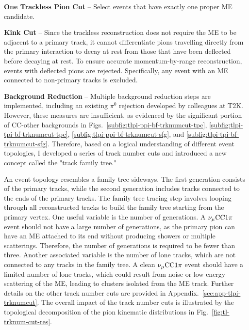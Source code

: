           \textbf{One Trackless Pion Cut} – Select events that have exactly one proper ME candidate.

          \textbf{Kink Cut} – Since the trackless reconstruction does not require the ME to be adjacent to a primary track, it cannot differentiate pions travelling directly from the primary interaction to decay at rest from those that have been deflected before decaying at rest. 
          To ensure accurate momentum-by-range reconstruction, events with deflected pions are rejected. 
          Specifically, any event with an ME connected to non-primary tracks is excluded.

          \textbf{Background Reduction} – Multiple background reduction steps are implemented, including an existing $\pi^0$ rejection developed by colleagues at T2K. 
          However, these measures are insufficient, as evidenced by the significant portion of CC-other backgrounds in Figs.~\ref{subfig:tlpi-ppi-bf-trknumcut-tpc}, \ref{subfig:tlpi-tpi-bf-trknumcut-tpc}, \ref{subfig:tlpi-ppi-bf-trknumcut-sfg}, and \ref{subfig:tlpi-tpi-bf-trknumcut-sfg}. 
          Therefore, based on a logical understanding of different event topologies, I developed a series of track number cuts and introduced a new concept called the "track family tree."

          An event topology resembles a family tree sideways. 
          The first generation consists of the primary tracks, while the second generation includes tracks connected to the ends of the primary tracks. 
          The family tree tracing step involves looping through all reconstructed tracks to build the family tree starting from the primary vertex. 
          One useful variable is the number of generations. 
          A $\nu_{\mu}\textrm{CC}1\pi$ event should not have a large number of generations, as the primary pion can have an ME attached to its end without producing showers or multiple scatterings. 
          Therefore, the number of generations is required to be fewer than three. 
          Another associated variable is the number of lone tracks, which are not connected to any tracks in the family tree. 
          A clean $\nu_{\mu}\textrm{CC}1\pi$ event should have a limited number of lone tracks, which could result from noise or low-energy scattering of the ME, leading to clusters isolated from the ME track. 
          Further details on the other track number cuts are provided in Appendix.~\ref{sec:app-tlpi-trknumcut}. 
          The overall impact of the track number cuts is illustrated by the topological decomposition of the pion kinematic distributions in Fig.~\ref{fig:tl-trknum-cut-res}.

